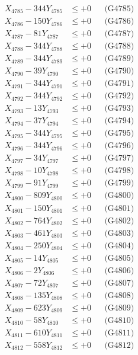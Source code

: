 \documentclass[a4paper,10pt]{article}
\begin{document}
{\begin{align}
X_{4785} - 344Y_{4785} &\leq +0 && \text{(G4785)} \\
X_{4786} - 150Y_{4786} &\leq +0 && \text{(G4786)} \\
X_{4787} - 81Y_{4787} &\leq +0 && \text{(G4787)} \\
X_{4788} - 344Y_{4788} &\leq +0 && \text{(G4788)} \\
X_{4789} - 344Y_{4789} &\leq +0 && \text{(G4789)} \\
X_{4790} - 39Y_{4790} &\leq +0 && \text{(G4790)} \\
\allowbreak
X_{4791} - 344Y_{4791} &\leq +0 && \text{(G4791)} \\
X_{4792} - 344Y_{4792} &\leq +0 && \text{(G4792)} \\
X_{4793} - 13Y_{4793} &\leq +0 && \text{(G4793)} \\
X_{4794} - 37Y_{4794} &\leq +0 && \text{(G4794)} \\
X_{4795} - 344Y_{4795} &\leq +0 && \text{(G4795)} \\
X_{4796} - 344Y_{4796} &\leq +0 && \text{(G4796)} \\
X_{4797} - 34Y_{4797} &\leq +0 && \text{(G4797)} \\
X_{4798} - 10Y_{4798} &\leq +0 && \text{(G4798)} \\
X_{4799} - 91Y_{4799} &\leq +0 && \text{(G4799)} \\
X_{4800} - 809Y_{4800} &\leq +0 && \text{(G4800)} \\
\allowbreak
X_{4801} - 150Y_{4801} &\leq +0 && \text{(G4801)} \\
X_{4802} - 764Y_{4802} &\leq +0 && \text{(G4802)} \\
X_{4803} - 461Y_{4803} &\leq +0 && \text{(G4803)} \\
X_{4804} - 250Y_{4804} &\leq +0 && \text{(G4804)} \\
X_{4805} - 14Y_{4805} &\leq +0 && \text{(G4805)} \\
X_{4806} - 2Y_{4806} &\leq +0 && \text{(G4806)} \\
X_{4807} - 72Y_{4807} &\leq +0 && \text{(G4807)} \\
X_{4808} - 135Y_{4808} &\leq +0 && \text{(G4808)} \\
X_{4809} - 623Y_{4809} &\leq +0 && \text{(G4809)} \\
X_{4810} - 58Y_{4810} &\leq +0 && \text{(G4810)} \\
\allowbreak
X_{4811} - 610Y_{4811} &\leq +0 && \text{(G4811)} \\
X_{4812} - 558Y_{4812} &\leq +0 && \text{(G4812)} \\

\end{align}}
\end{document}
